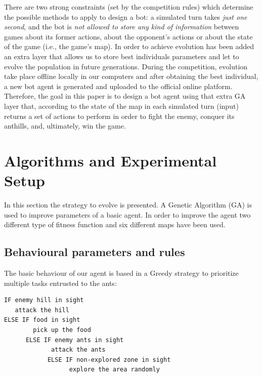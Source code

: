 \documentclass[runningheads]{llncs}
\begin{document}
There are two strong constraints (set by the competition rules) which determine the possible methods to apply to design a bot: a simulated turn takes \textit{just one second}, and the bot is \textit{not allowed to store any kind of information} between games about its former actions, about the opponent's actions or about the state of the game (i.e., the game's map). In order to achieve evolution has been added an extra layer that allows us to store best individuals parameters and let to evolve the population in future generations. During the competition, evolution take place offline locally in our computers and after obtaining the best individual, a new bot agent is generated and uploaded to the official online platform.
Therefore, the goal in this paper is to design a bot agent using that extra GA layer that, according to the state of the map in each simulated turn (input) returns a set of actions to perform in order to fight the enemy, conquer its anthills, and, ultimately, win the game. 




\section{Algorithms and Experimental Setup}

In this section the strategy to evolve is presented. A Genetic Algorithm (GA) is used to improve parameters of a basic agent.  In order to improve the agent two different type of fitness function and six different maps have been used. 


\subsection{Behavioural parameters and rules}

The basic behaviour of our agent is based in a Greedy strategy to prioritize multiple tasks entrusted to the ants:
\begin{verbatim}
IF enemy hill in sight
   attack the hill 
ELSE IF food in sight 
        pick up the food
	  ELSE IF enemy ants in sight
             attack the ants
		    ELSE IF non-explored zone in sight 
                  explore the area randomly
\end{verbatim}
\end{document}
